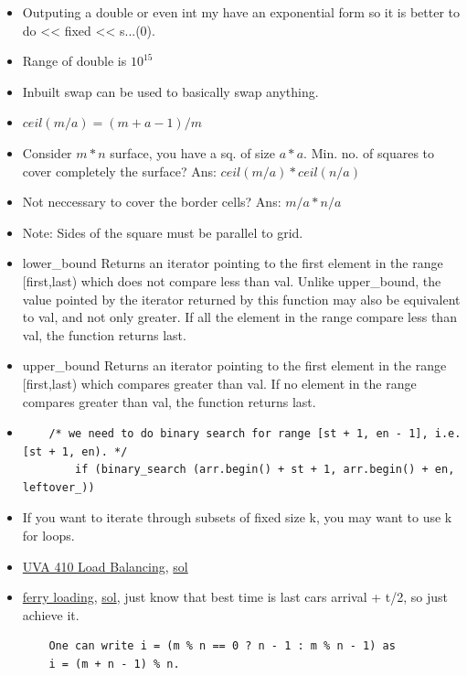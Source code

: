 \documentclass[8pt, a4paper, oneside, twocolumn]{extarticle}
\begin{document}
\begin{itemize}
    \item Outputing a double or even int my have an exponential form so it is better to do << fixed << s...(0).
    \item Range of double is $10^{15}$
    \item Inbuilt swap can be used to basically swap anything.
    \item $ceil(m/a) = (m + a - 1) / m$
    \item Consider $m*n$ surface, you have a sq. of size $a*a$. Min. no. of squares to cover completely the surface? Ans: $ceil(m/a)*ceil(n/a)$
    \item Not neccessary to cover the border cells? Ans: $m/a * n/a$
    \item Note: Sides of the square must be parallel to grid.
    \item  lower\_bound Returns an iterator pointing to the first element in the range [first,last) which does not compare less than val. Unlike upper\_bound, the value pointed by the iterator returned by this function may also be equivalent to val, and not only greater. If all the element in the range compare less than val, the function returns last.
    \item upper\_bound Returns an iterator pointing to the first element in the range [first,last) which compares greater than val. If no element in the range compares greater than val, the function returns last.
    \item 
    \begin{verbatim}
    /* we need to do binary search for range [st + 1, en - 1], i.e. [st + 1, en). */
        if (binary_search (arr.begin() + st + 1, arr.begin() + en, leftover_))
    \end{verbatim}
    \item If you want to iterate through subsets of fixed size k, you may want to use k for loops.
    \item \href{https://uva.onlinejudge.org/external/4/410.pdf}{UVA 410 Load Balancing}, \href{https://gist.github.com/sourabh2311/5405601b47b1bd9c8fa769c82b280328}{sol}
    \item \href{https://uva.onlinejudge.org/external/104/10440.pdf}{ferry loading}, \href{https://gist.github.com/sourabh2311/4af5bc294ab613057de828b308da587a}{sol}, just know that best time is last cars arrival + t/2, so just achieve it.
    \begin{verbatim}
    One can write i = (m % n == 0 ? n - 1 : m % n - 1) as
    i = (m + n - 1) % n.
    \end{verbatim}

\end{itemize}
\end{document}
